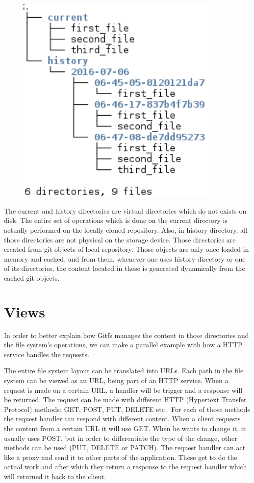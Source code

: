 \begin{figure}[h]
  \begin{center}
    \includegraphics[width=10cm]{layout/gitfs_layout.png}
  \end{center}
\end{figure}

The current and history directories are virtual directories which do not exists on disk. The entire set of operations which is done on the current directory is actually performed on the locally cloned repository. Also, in history directory, all those directories are not physical on the storage device. Those directories are created from git objects of local repository. Those objects are only once loaded in memory and cached, and from them, whenever one uses history directory or one of its directories, the content located in those is generated dynamically from the cached git objects.

\section{Views}
In order to better explain how Gitfs manages the content in those directories and the file system's operations, we can make a parallel example with how a HTTP service handles the requests. 

The entire file system layout can be translated into URLs. Each path in the file system can be viewed as an URL, being part of an HTTP service. When a request is made on a certain URL, a handler will be trigger and a response will be returned. The request can be made with different HTTP (Hypertext Transfer Protocol) methods: GET, POST, PUT, DELETE etc \cite{Fielding1999}. For each of those methods the request handler can respond with different content. When a client requests the content from a certain URL it will use GET. When he wants to change it, it usually uses POST, but in order to differentiate the type of the change, other methods can be used (PUT, DELETE or PATCH). The request handler can act like a proxy and send it to other parts of the application. These get to do the actual work and after which they return a response to the request handler which will returned it back to the client.

